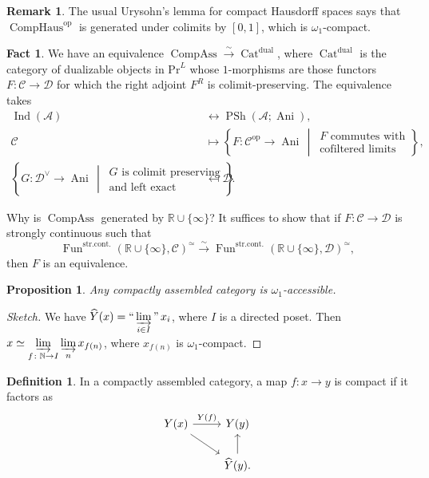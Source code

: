 \documentclass[draft]{amsart}
\newcommand{\NN}{\mathbb{N}}
\newcommand{\RR}{\mathbb{R}}
\newcommand{\set}[2]{\left\{#1\,\middle|\,#2\right\}}
\newcommand{\wh}[1]{\widehat{#1}}
\newcommand{\cat}[1]{\mathcal{#1}}
\newcommand{\op}{\mathrm{op}}
\newcommand{\isoto}{\mathbin{\xrightarrow{\sim}}}
\renewcommand{\Pr}{\mathrm{Pr}}
\DeclareMathOperator{\Anima}{Ani}
\DeclareMathOperator{\Ind}{Ind}
\DeclareMathOperator{\Cat}{Cat}
\DeclareMathOperator{\CompAss}{CompAss}
\DeclareMathOperator{\Fun}{Fun}
\DeclareMathOperator{\CompHaus}{CompHaus}
\DeclareMathOperator{\PSh}{PSh}
\DeclareMathOperator*{\indinjlim}{\text{``}\varinjlim\text{''}} %
\newtheorem{prop}[thm]{Proposition}
\theoremstyle{definition}
\newtheorem{defn}[thm]{Definition}
\newtheorem{rem}[thm]{Remark}
\newtheorem{fact}[thm]{Fact}
\begin{document}
\begin{rem}
The usual Urysohn's lemma for compact Hausdorff spaces says that $\CompHaus^\op$ is generated under colimits by $[0,1]$, which is $\omega_1$-compact.
\end{rem}

\begin{fact}
We have an equivalence
$\CompAss \isoto \Cat^{\mathrm{dual}}$, where $\Cat^{\mathrm{dual}}$ is the category of dualizable objects in $\Pr^L$ whose $1$-morphisms are those functors $F\colon \cat C\to \cat D$ for which the right adjoint $F^R$ is colimit-preserving. The equivalence takes
\begin{align*}
\Ind(\cat A) &\leftrightarrow \PSh(\cat A; \Anima), \\
\cat C &\mapsto \set{F\colon \cat C^\op \to \Anima}{\begin{array}{l}\text{$F$ commutes with} \\ \text{cofiltered limits}\end{array}}, \\
\set{G\colon \cat D^\vee \to \Anima}{\begin{array}{l}\text{$G$ is colimit preserving} \\ \text{and left exact}\end{array}} &\mapsfrom \cat D.
\end{align*}
\end{fact}

Why is $\CompAss$ generated by $\RR\cup \{\infty\}$? It suffices to show that if $F\colon \cat C\to \cat D$ is strongly continuous such that
\[
\Fun^{\mathrm{str.cont.}}(\RR\cup \{\infty\}, \cat C)^{\simeq} \isoto \Fun^{\mathrm{str.cont.}}(\RR\cup \{\infty\}, \cat D)^{\simeq},
\]
then $F$ is an equivalence.

\begin{prop}
Any compactly assembled category is $\omega_1$-accessible.
\end{prop}
\begin{proof}[Sketch]
We have $\wh{Y}(x) = \indinjlim\limits_{i\in I} x_i$, where $I$ is a directed poset. Then $x\simeq \varinjlim\limits_{f\colon \NN\to I} \varinjlim\limits_{n} x_{f(n)}$, where $x_{f(n)}$ is $\omega_1$-compact.
\end{proof}

\begin{defn}
In a compactly assembled category, a map $f\colon x\to y$ is compact if it factors as
\[
\begin{tikzcd}
Y(x)\ar[r,"Y(f)"] \ar[dr] & Y(y) \\
& \wh{Y}(y)\ar[u].
\end{tikzcd}
\]
\end{defn}
\end{document}
